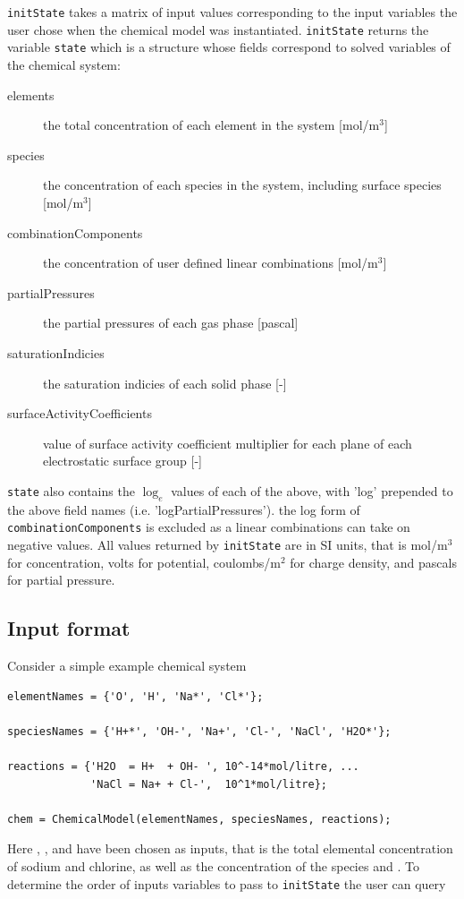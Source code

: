 \documentclass{article}
\begin{document}
\verb|initState| takes a matrix of input values corresponding to the input variables the user chose when the chemical model was instantiated. \verb|initState| returns the variable \verb|state| which is a structure whose fields correspond to solved variables of the chemical system:
{\footnotesize
\begin{description}
\item[elements] the total concentration of each element in the system [mol/m$^3$]
\item[species] the concentration of each species in the system, including surface species [mol/m$^3$]
\item[combinationComponents] the concentration of user defined linear combinations [mol/m$^3$]
\item[partialPressures] the partial pressures of each gas phase [pascal]
\item[saturationIndicies] the saturation indicies of each solid phase [-]
\item[surfaceActivityCoefficients] value of surface activity coefficient multiplier for each plane of each electrostatic surface group [-]
\end{description}}
\verb|state| also contains the $\log_e$ values of each of the above, with 'log' prepended to the above field names (i.e. 'logPartialPressures'). the log form of \verb|combinationComponents| is excluded as a linear combinations can take on negative values. All values returned by \verb|initState| are in SI units, that is mol/m$^3$ for concentration, volts for potential, coulombs/m$^2$ for charge density, and pascals for partial pressure.

\subsection{Input format} \label{sec:format}

Consider a simple example chemical system
\begin{lstlisting}
elementNames = {'O', 'H', 'Na*', 'Cl*'};

speciesNames = {'H+*', 'OH-', 'Na+', 'Cl-', 'NaCl', 'H2O*'};

reactions = {'H2O  = H+  + OH- ', 10^-14*mol/litre, ...
             'NaCl = Na+ + Cl-',  10^1*mol/litre};

chem = ChemicalModel(elementNames, speciesNames, reactions);
\end{lstlisting}
Here , ,  and  have been chosen as inputs, that is the total elemental concentration of sodium and chlorine, as well as the concentration of the species  and . To determine the order of inputs variables to pass to \verb|initState| the user can query 
\end{document}
